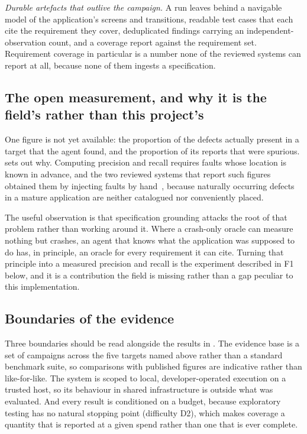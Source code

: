 \emph{Durable artefacts that outlive the campaign.} A run leaves behind a
navigable model of the application's screens and transitions, readable test
cases that each cite the requirement they cover, deduplicated findings carrying
an independent-observation count, and a coverage report against the requirement
set. Requirement coverage in particular is a number none of the reviewed systems
can report at all, because none of them ingests a specification.

\subsection*{The open measurement, and why it is the field's rather than this
project's}

One figure is not yet available: the proportion of the defects actually present
in a target that the agent found, and the proportion of its reports that were
spurious.  sets out why. Computing precision and recall
requires faults whose location is known in advance, and the two reviewed systems
that report such figures obtained them by injecting faults by
hand~\cite{auitestagent}, because naturally occurring defects in a mature
application are neither catalogued nor conveniently placed.

The useful observation is that specification grounding attacks the root of that
problem rather than working around it. Where a crash-only oracle can measure
nothing but crashes, an agent that knows what the application was supposed to do
has, in principle, an oracle for every requirement it can cite. Turning that
principle into a measured precision and recall is the experiment described in F1
below, and it is a contribution the field is missing rather than a gap peculiar
to this implementation.

\subsection*{Boundaries of the evidence}

Three boundaries should be read alongside the results in .
The evidence base is a set of campaigns across the five targets named above
rather than a standard benchmark suite, so comparisons with published figures
are indicative rather than like-for-like. The system is scoped to local,
developer-operated execution on a trusted host, so its behaviour in shared
infrastructure is outside what was evaluated. And every result is conditioned on
a budget, because exploratory testing has no natural stopping point
(difficulty D2), which makes coverage a quantity that is reported at a given
spend rather than one that is ever complete.


